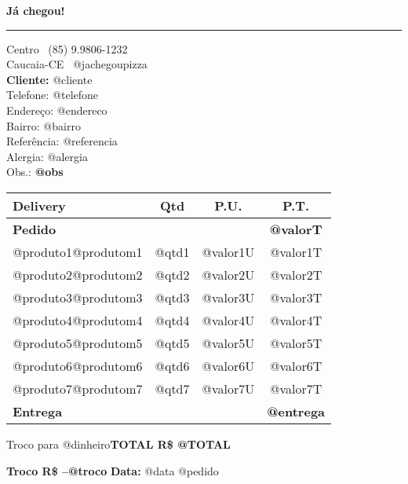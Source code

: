\documentclass{article}
\begin{document}
\hfil{\large \bf Já chegou!}\hfil %
\smallskip\break %
\hrule %

\noindent Centro \hfill\faWhatsapp\ (85) 9.9806-1232 \\ %
Caucaia-CE \hfill\faInstagram\ @jachegoupizza
\\ 

{\bf \noindent Cliente:} @cliente \\ %
\noindent Telefone: @telefone \\ %
Endereço: @endereco \\
Bairro: @bairro \\
Referência: @referencia \\
Alergia: @alergia \\
Obs.: \textbf{@obs}\\

\begin{table}[!h]
    \centering
    \begin{tabularx}{\textwidth}{Xccc}
    \hline \textbf{Delivery\hfill} & \textbf{Qtd} & \textbf{P.U.} & \textbf{P.T.} \\
    \hline  \textbf{Pedido}     &       &          & \textbf{@valorT}  \\
            @produto1@produtom1 & @qtd1 & @valor1U & @valor1T \\
            @produto2@produtom2 & @qtd2 & @valor2U & @valor2T \\
            @produto3@produtom3 & @qtd3 & @valor3U & @valor3T \\
            @produto4@produtom4 & @qtd4 & @valor4U & @valor4T \\
            @produto5@produtom5 & @qtd5 & @valor5U & @valor5T \\
            @produto6@produtom6 & @qtd6 & @valor6U & @valor6T \\
            @produto7@produtom7 & @qtd7 & @valor7U & @valor7T \\
            \textbf{Entrega}    &       &          & \textbf{@entrega} \\ \hline
    \end{tabularx}
\end{table}
Troco para @dinheiro\hfill{\textbf{TOTAL R\$ @TOTAL}}

\hfill{\textbf{Troco R\$ --@troco}}
\vfill {\noindent \bf Data:} @data \hfill @pedido
\end{document}
